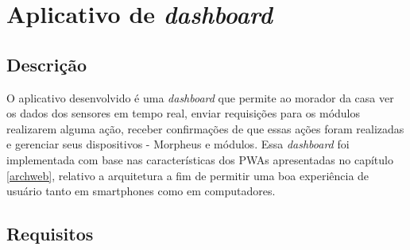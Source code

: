 \section{Aplicativo de \textit{dashboard}}

\subsection{Descrição}
O aplicativo desenvolvido é uma \textit{dashboard} que permite ao morador da casa ver os dados dos sensores em tempo real, enviar requisições para os módulos realizarem alguma ação, receber confirmações de que essas ações foram realizadas e gerenciar seus dispositivos - Morpheus e módulos. Essa \textit{dashboard} foi implementada com base nas características dos PWAs apresentadas no capítulo \ref{archweb}, relativo a arquitetura a fim de permitir uma boa experiência de usuário tanto em smartphones como em computadores.

\subsection{Requisitos}

